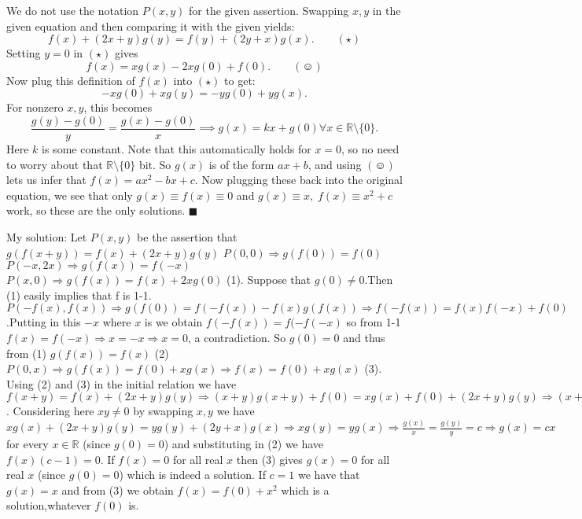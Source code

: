 \begin{solution}
	We do not use the notation $P(x,y)$ for the given assertion. Swapping $x,y$ in the given equation and then comparing it with the given yields: $$f(x)+(2x+y)g(y)=f(y)+(2y+x)g(x).\qquad (\star)$$Setting $y=0$ in $(\star)$ gives $$f(x)=xg(x)-2xg(0)+f(0).\qquad (\smiley )$$Now plug this definition of $f(x)$ into $(\star)$ to get: $$-xg(0)+xg(y)=-yg(0)+yg(x).$$For nonzero $x,y$, this becomes $$\frac{g(y)-g(0)}{y}=\frac{g(x)-g(0)}{x}\implies g(x)=kx+g(0)\forall x\in\mathbb R\setminus \{0\}.$$ Here $k$ is some constant. Note that this automatically holds for $x=0$, so no need to worry about that $\mathbb R\setminus \{0\}$ bit. So $g(x)$ is of the form $ax+b$, and using $(\smiley )$ lets us infer that $f(x)=ax^2-bx+c$. Now plugging these back into the original equation, we see that only $\boxed{g(x)\equiv f(x)\equiv 0}$ and $\boxed{g(x)\equiv x, \; f(x)\equiv x^2+c}$ work, so these are the only solutions. $\blacksquare$
\end{solution}



\begin{solution}
	My solution:
Let $P(x,y)$ be the assertion that $g(f(x+y))=f(x)+(2x+y)g(y)$
$P(0,0) \Rightarrow g(f(0))=f(0)$
$P(-x,2x) \Rightarrow g(f(x))=f(-x)$
$P(x,0) \Rightarrow g(f(x))=f(x)+2xg(0)$ (1).
Suppose that $g(0) \neq 0$.Then (1) easily implies that f is 1-1.
$P(-f(x),f(x)) \Rightarrow g(f(0))=f(-f(x))-f(x)g(f(x)) \Rightarrow f(-f(x))=f(x)f(-x)+f(0)$                                                                                                  .Putting in this $-x$ where $x$ is we obtain
$f(-f(x))=f(-f(-x)$ so from 1-1 $f(x)=f(-x) \Rightarrow x=-x \Rightarrow x=0$, a contradiction. So $g(0)=0$ and thus from (1) $g(f(x))=f(x)$ (2)
$P(0,x) \Rightarrow g(f(x))=f(0)+xg(x) \Rightarrow f(x)=f(0)+xg(x)$ (3).
Using (2) and (3) in the initial relation we have $f(x+y)=f(x)+(2x+y)g(y) \Rightarrow (x+y)g(x+y)+f(0)=xg(x)+f(0)+(2x+y)g(y) \Rightarrow (x+y)g(x+y)=xg(x)+(2x+y)g(y)$.                                                                                                                                   Considering here $xy \neq 0$ by swapping $x,y$ we have $xg(x)+(2x+y)g(y)=yg(y)+(2y+x)g(x) \Rightarrow xg(y)=yg(x) \Rightarrow \frac {g(x)} {x}=\frac {g(y)} {y}=c \Rightarrow g(x)=cx$ for every $x \in \mathbb{R}$
(since $g(0)=0$) and substituting in (2) we have $f(x)(c-1)=0$.
If $f(x)=0$ for all real $x$ then (3) gives $g(x)=0$ for all real $x$ (since $g(0)=0$) which is indeed a solution.
If $c=1$ we have that $g(x)=x$ and from (3) we obtain $f(x)=f(0)+x^2$ which is a solution,whatever $f(0)$ is.
\end{solution}



